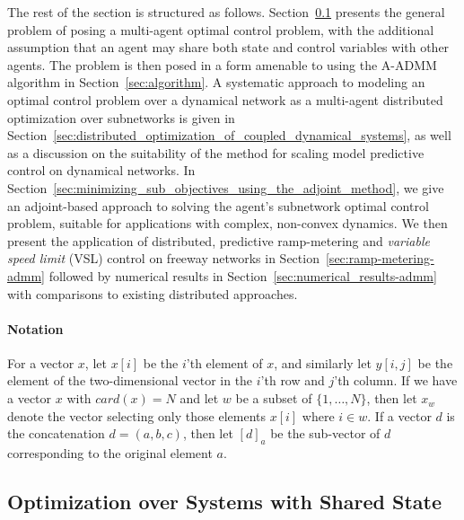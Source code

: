 The rest of the section is structured as follows. Section~\ref{sec:problem_statement} presents the general problem of posing a multi-agent optimal control problem, with the additional assumption that an agent may share both state and control variables with other agents. The problem is then posed in a form amenable to using the A-ADMM algorithm in Section~\ref{sec:algorithm}. A systematic approach to modeling an optimal control problem over a dynamical network as a multi-agent distributed optimization over subnetworks is given in Section~\ref{sec:distributed_optimization_of_coupled_dynamical_systems}, as well as a discussion on the suitability of the method for scaling model predictive control on dynamical networks. In Section~\ref{sec:minimizing_sub_objectives_using_the_adjoint_method}, we give an adjoint-based approach to solving the agent's subnetwork optimal control problem, suitable for applications with complex, non-convex dynamics. We then present the application of distributed, predictive ramp-metering and \emph{variable speed limit} (VSL) control on freeway networks in Section~\ref{sec:ramp-metering-admm} followed by numerical results in Section~\ref{sec:numerical_results-admm} with comparisons to existing distributed approaches.

\paragraph*{\textbf{Notation}}

For a vector $x$, let $x\left[i\right]$ be the $i$'th element of $x$, and similarly let $y\left[i,j\right]$ be the element of the two-dimensional vector in the $i$'th row and $j$'th column. If we have a vector $x$ with $card\left(x\right)=N$ and let $w$ be a subset of $ \{1,\ldots,N\}$, then let $x_w$ denote the vector selecting only those elements $x\left[i\right]$ where $i\in w$. If a vector $d$ is the concatenation $d = \left(a,b,c\right)$, then let $\left[d\right]_a$ be the sub-vector of $d$ corresponding to the original element $a$.


\subsection{Optimization over Systems with Shared State}
\label{sec:problem_statement}


